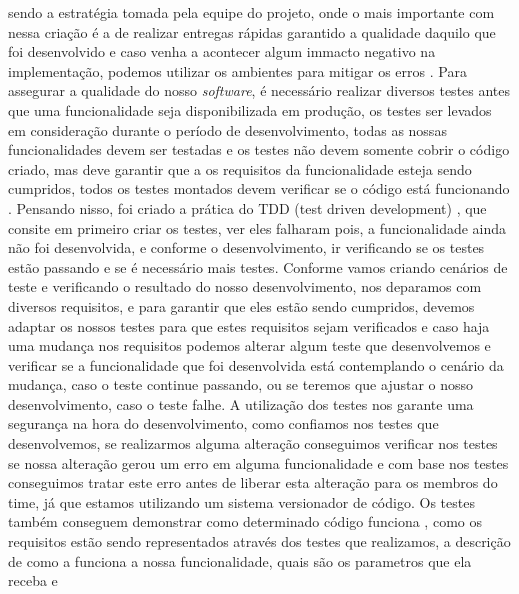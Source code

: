     sendo a estratégia tomada pela equipe do projeto, onde o mais importante com
    nessa criação é a de realizar entregas rápidas garantido a qualidade daquilo
    que foi desenvolvido e caso venha a acontecer algum immacto negativo na
    implementação, podemos utilizar os ambientes para mitigar os erros
    \cite{TheDevOpsHandbook}. \newline
    Para assegurar a qualidade do nosso \textit{software}, é necessário realizar
    diversos testes antes que uma funcionalidade seja disponibilizada em produção,
    os testes ser levados em consideração durante o período de desenvolvimento,
    todas as nossas funcionalidades devem ser testadas e os testes não devem
    somente cobrir o código criado, mas deve garantir que a os requisitos da
    funcionalidade esteja sendo cumpridos, todos os testes montados devem verificar
    se o código está funcionando \cite{CleanCode}. \newline
    Pensando nisso, foi criado a prática do TDD (test driven development)
    \cite{TestDrivenDevelopment}, que consite em primeiro criar os testes, ver
    eles falharam pois, a funcionalidade ainda não foi desenvolvida, e conforme
    o desenvolvimento, ir verificando se os testes estão passando e se é necessário
    mais testes. Conforme vamos criando cenários de teste e verificando o resultado
    do nosso desenvolvimento, nos deparamos com diversos requisitos, e para
    garantir que eles estão sendo cumpridos, devemos adaptar os nossos testes para
    que estes requisitos sejam verificados e caso haja uma mudança nos requisitos
    podemos alterar algum teste que desenvolvemos e verificar se a funcionalidade
    que foi desenvolvida está contemplando o cenário da mudança, caso o teste
    continue passando, ou se teremos que ajustar o nosso desenvolvimento, caso o
    teste falhe. \newline
    A utilização dos testes nos garante uma segurança na hora do desenvolvimento,
    como confiamos nos testes que desenvolvemos, se realizarmos alguma alteração
    conseguimos verificar nos testes se nossa alteração gerou um erro em alguma
    funcionalidade e com base nos testes conseguimos tratar este erro antes de
    liberar esta alteração para os membros do time, já que estamos utilizando um
    sistema versionador de código. Os testes também conseguem demonstrar como
    determinado código funciona \cite{martin2007agile}, como os requisitos estão
    sendo representados através dos testes que realizamos, a descrição de como
    a funciona a nossa funcionalidade, quais são os parametros que ela receba e
